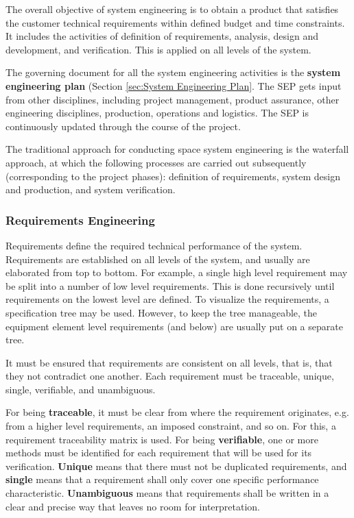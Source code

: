 The overall objective of system engineering is to obtain a product that satisfies the customer technical requirements within defined budget and time constraints. It includes the activities of definition of requirements, analysis, design and development, and verification. This is applied on all levels of the system. 

The governing document for all the system engineering activities is the \textbf{system engineering plan} (Section \ref{sec:System Engineering Plan}. The SEP gets input from other disciplines, including project management, product assurance, other engineering disciplines, production, operations and logistics. The SEP is continuously updated through the course of the project.

The traditional approach for conducting space system engineering is the waterfall approach, at which the following processes are carried out subsequently (corresponding to the project phases): definition of requirements, system design and production, and system verification.

\subsubsection{Requirements Engineering}

Requirements define the required technical performance of the system. Requirements are established on all levels of the system, and usually are elaborated from top to bottom. For example, a single high level requirement may be split into a number of low level requirements. This is done recursively until requirements on the lowest level are defined. To visualize the requirements, a specification tree may be used. However, to keep the tree manageable, the equipment element level requirements (and below) are usually put on a separate tree.

It must be ensured that requirements are consistent on all levels, that is, that they not contradict one another. Each requirement must be traceable, unique, single, verifiable, and unambiguous.

For being \textbf{traceable}, it must be clear from where the requirement originates, e.g. from a higher level requirements, an imposed constraint, and so on. For this, a requirement traceability matrix is used. For being \textbf{verifiable}, one or more methods must be identified for each requirement that will be used for its verification. \textbf{Unique} means that there must not be duplicated requirements, and \textbf{single} means that a requirement shall only cover one specific performance characteristic. \textbf{Unambiguous} means that requirements shall be written in a clear and precise way that leaves no room for interpretation.

